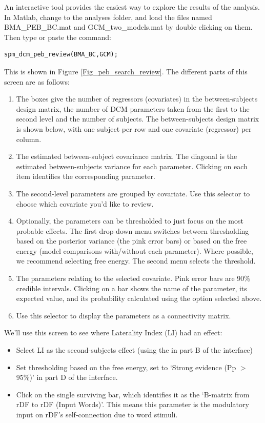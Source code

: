 \documentclass{article}
\begin{document}
An interactive tool provides the easiest way to explore the results of the analysis. In Matlab, change to the analyses folder, and load the files named BMA\_PEB\_BC.mat and GCM\_two\_models.mat by double clicking on them. Then type or paste the command:

\begin{lstlisting}[style=Matlab-editor,caption=PEB review tool]
spm_dcm_peb_review(BMA_BC,GCM);
\end{lstlisting}

This is shown in Figure \ref{Fig_peb_search_review}. The different parts of this screen are as follows:

\begin{enumerate}[label=\Alph*)]
\item The boxes give the number of regressors (covariates) in the between-subjects design matrix, the number of DCM parameters taken from the first to the second level and the number of subjects. The between-subjects design matrix is shown below, with one subject per row and one covariate (regressor) per column.
\item The estimated between-subject covariance matrix. The diagonal is the estimated between-subjects variance for each parameter. Clicking on each item identifies the corresponding parameter.
\item The second-level parameters are grouped by covariate. Use this selector to choose which covariate you'd like to review.
\item Optionally, the parameters can be thresholded to just focus on the most probable effects. The first drop-down menu switches between thresholding based on the posterior variance (the pink error bars) or based on the free energy (model comparisons with/without each parameter). Where possible, we recommend selecting free energy. The second menu selects the threshold.
\item The parameters relating to the selected covariate. Pink error bars are 90\% credible intervals. Clicking on a bar shows the name of the parameter, its expected value, and its probability calculated using the option selected above.
\item Use this selector to display the parameters as a connectivity matrix.
\end{enumerate}

We'll use this screen to see where Laterality Index (LI) had an effect:

\begin{itemize}
    \item Select LI as the second-subjects effect (using the in part B of the interface)
    \item Set thresholding based on the free energy, set to `Strong evidence (Pp $>$ 95\%)' in part D of the interface.
    \item Click on the single surviving bar, which identifies it as the `B-matrix from rDF to rDF (Input Words)'. This means this parameter is the modulatory input on rDF's self-connection due to word stimuli.
\end{itemize}
\end{document}
